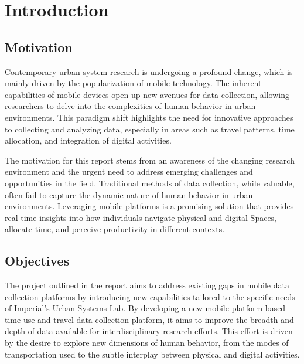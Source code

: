 \documentclass[12pt,two side]{report}
\date{June 2024}
\begin{document}



\clearpage{\pagestyle{empty}\cleardoublepage}
\setcounter{page}{1}
\pagestyle{fancy}
\tableofcontents 

\setcounter{page}{1}
\fancyhead[LE,RO]{\slshape \rightmark}
\fancyhead[LO,RE]{\slshape \leftmark}

\chapter{Introduction}
\section{Motivation}
Contemporary urban system research is undergoing a profound change, which is mainly driven by the popularization of mobile technology. The inherent capabilities of mobile devices open up new avenues for data collection, allowing researchers to delve into the complexities of human behavior in urban environments. This paradigm shift highlights the need for innovative approaches to collecting and analyzing data, especially in areas such as travel patterns, time allocation, and integration of digital activities.\newline

The motivation for this report stems from an awareness of the changing research environment and the urgent need to address emerging challenges and opportunities in the field. Traditional methods of data collection, while valuable, often fail to capture the dynamic nature of human behavior in urban environments. Leveraging mobile platforms is a promising solution that provides real-time insights into how individuals navigate physical and digital Spaces, allocate time, and perceive productivity in different contexts.
\section{Objectives}
The project outlined in the report aims to address existing gaps in mobile data collection platforms by introducing new capabilities tailored to the specific needs of Imperial's Urban Systems Lab. By developing a new mobile platform-based time use and travel data collection platform, it aims to improve the breadth and depth of data available for interdisciplinary research efforts. This effort is driven by the desire to explore new dimensions of human behavior, from the modes of transportation used to the subtle interplay between physical and digital activities.\newline
\end{document}
